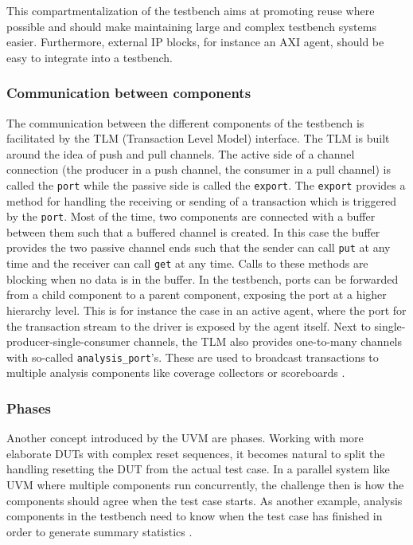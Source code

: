 \documentclass[12pt]{report}
\newcommand{\ttt}{\texttt}
\begin{document}
This compartmentalization of the testbench aims at promoting reuse where possible and should make maintaining large
and complex testbench systems easier. Furthermore, external IP blocks, for instance an AXI agent, should be easy to
integrate into a testbench.

\subsubsection{Communication between components} %

The communication between the different components of the testbench is facilitated by the TLM (Transaction Level
Model) interface. The TLM is built around the idea of push and pull channels. The active side of a channel connection
(the producer in a push channel, the consumer in a pull channel) is called the \ttt{port} while the passive side is
called the \ttt{export}. The \ttt{export} provides a method for handling the receiving or sending of a transaction
which is triggered by the \ttt{port}. Most of the time, two components are connected with a buffer between them such
that a buffered channel is created. In this case the buffer provides the two passive channel ends such that the
sender can call \ttt{put} at any time and the receiver can call \ttt{get} at any time. Calls to these methods are
blocking when no data is in the buffer. In the testbench, ports can be forwarded from a child component to a parent
component, exposing the port at a higher hierarchy level. This is for instance the case in an active agent, where the
port for the transaction stream to the driver is exposed by the agent itself. Next to single-producer-single-consumer
channels, the TLM also provides one-to-many channels with so-called \ttt{analysis\_port}'s. These are used to
broadcast transactions to multiple analysis components like coverage collectors or scoreboards \cite[ch. 4.5]{mehta2018asic}.

\subsubsection{Phases}
Another concept introduced by the UVM are phases. Working with more elaborate DUTs with complex reset sequences, it
becomes natural to split the handling resetting the DUT from the actual test case. In a parallel system like UVM
where multiple components run concurrently, the challenge then is how the components should agree when the test case
starts. As another example, analysis components in the testbench need to know when the test case has finished in
order to generate summary statistics \cite[ch. 4.6]{mehta2018asic}.
\end{document}
